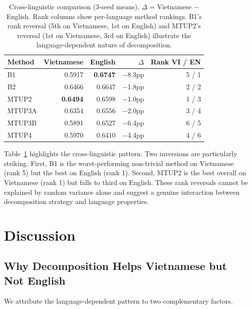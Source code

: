 \documentclass[11pt,a4paper]{article}
\begin{document}
\begin{table}[t]
\centering
\small
\begin{tabular}{lrrrr}
\toprule
\textbf{Method} & \textbf{Vietnamese} & \textbf{English} & \textbf{$\Delta$} & \textbf{Rank VI / EN} \\
\midrule
B1       & 0.5917 & \textbf{0.6747} & $-$8.3pp & 5 / 1 \\
B2       & 0.6466 & 0.6647          & $-$1.8pp & 2 / 2 \\
MTUP2    & \textbf{0.6494} & 0.6598 & $-$1.0pp & 1 / 3 \\
MTUP3A   & 0.6354 & 0.6556          & $-$2.0pp & 3 / 4 \\
MTUP3B   & 0.5891 & 0.6527          & $-$6.4pp & 6 / 5 \\
MTUP4    & 0.5970 & 0.6410          & $-$4.4pp & 4 / 6 \\
\bottomrule
\end{tabular}
\caption{Cross-linguistic comparison (3-seed means). $\Delta$ = Vietnamese $-$ English.
Rank columns show per-language method rankings. B1's rank reversal (5th on
Vietnamese, 1st on English) and MTUP2's reversal (1st on Vietnamese, 3rd on
English) illustrate the language-dependent nature of decomposition.}
\label{tab:crosslingual}
\end{table}

Table~\ref{tab:crosslingual} highlights the cross-linguistic pattern. Two
inversions are particularly striking. First, B1 is the worst-performing
non-trivial method on Vietnamese (rank 5) but the best on English (rank 1).
Second, MTUP2 is the best overall on Vietnamese (rank 1) but falls to third on
English. These rank reversals cannot be explained by random variance alone and
suggest a genuine interaction between decomposition strategy and language
properties.

\section{Discussion}
\label{sec:discussion}

\subsection{Why Decomposition Helps Vietnamese but Not English}

We attribute the language-dependent pattern to two complementary factors.
\end{document}

